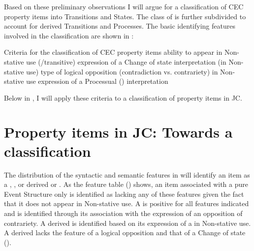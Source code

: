 Based on these preliminary observations I will argue for a classification of CEC property items into Transitions and States. The class of  is further subdivided to account for derived Transitions and Processes. The basic identifying features involved in the classification are shown in : 

\ea%
\label{ex:5:6}
Criteria for the classification of CEC property items
\ea ability to appear in Non-stative use (\slash transitive)
\ex expression of a Change of state interpretation (in Non-stative use)
\ex type of logical opposition (contradiction vs. contrariety) in Non-stative use
\ex expression of a Processual () interpretation
\z
\z 

Below in , I will apply these criteria to a classification of property items in JC.\largerpage[-3]


\section{Property items in JC: Towards a classification}\label{sec:5.2}

The distribution of the syntactic and semantic features in  will identify an item as a , , or derived  or . As the feature table () shows, an item associated with a pure  Event Structure only is identified as lacking any of these features given the fact that it does not appear in Non-stative use. A  is positive for all features indicated and is identified through its association with the expression of an opposition of contrariety. A derived  is identified based on its expression of a  in Non-stative use. A derived  lacks the feature of a logical opposition and that of a Change of state ().

